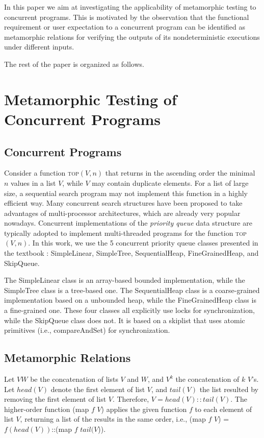 \documentclass[conference]{IEEEtran}
\theoremstyle{remark}
\newcommand{\Fn}{\textsc{top}}
\begin{document}
In this paper we aim at investigating the applicability of metamorphic testing to concurrent programs. This is motivated by the observation that the functional requirement or user expectation to a concurrent program can be identified as metamorphic relations for verifying the outputs of its nondeterministic executions under different inputs.

The rest of the paper is organized as follows.

\section{Metamorphic Testing of Concurrent Programs}
\subsection{Concurrent Programs}

Consider a function \Fn$(V,n)$ that returns in the ascending order the minimal $n$ values in a list $V$, while $V$ may contain duplicate elements. For a list of large size, a sequential search program may not implement this function in a highly efficient way. Many concurrent search structures have been proposed to take advantages of multi-processor architectures, which are already very popular nowadays. Concurrent implementations of the \emph{priority queue} data structure are typically adopted to implement multi-threaded programs for the function \Fn$(V,n)$. In this work, we use the 5 concurrent priority queue classes presented in the textbook \cite{PQUEUE}: SimpleLinear, SimpleTree, SequentialHeap, FineGrainedHeap, and SkipQueue.

The SimpleLinear class is an array-based bounded implementation, while the SimpleTree class is a tree-based one. The SequentialHeap class is a coarse-grained implementation based on a unbounded heap, while the FineGrainedHeap class is a fine-grained one. These four classes all explicitly use locks for synchronization, while the SkipQueue class does not. It is based on a skiplist that uses atomic primitives (i.e., compareAndSet) for synchronization.

\subsection{Metamorphic Relations}
Let $VW$ be the concatenation of lists $V$ and $W$, and $V^k$ the concatenation of $k$ $V$'s. Let $head(V)$ denote the first element of list $V$, and $tail(V)$ the list resulted by removing the first element of list $V$. Therefore, $V=head(V)::tail(V)$. The higher-order function  (map $f$ $V$) applies the given function $f$ to each element of list $V$, returning a list of the results in the same order, i.e., (map $f$ $V$) = $f(head(V))$::(map $f$ $tail(V$)). 
\end{document}
